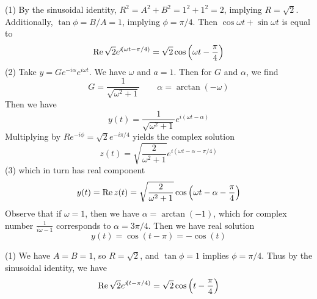 \documentclass[a4paper]{article}
\begin{document}

(1) By the sinusoidal identity, \(R^{2} = A^{2} + B^{2} = 1^{2} + 1^{2} = 2\), implying \(R = \sqrt{2}\). Additionally, \(\tan \phi = B/A = 1\), implying \(\phi = \pi / 4\). Then \(\cos \omega t + \sin \omega t\) is equal to
\[
	\operatorname{Re} \sqrt{2} e^{i \!\left( \omega t - \pi / 4 \right) } = \sqrt{2} \cos\left( \omega t - \frac{\pi }{4} \right)
\]
(2) Take \(y = Ge^{-i \alpha } e^{i \omega t}\). We have \(\omega \) and \(a = 1\). Then for \(G\) and \(\alpha \), we find
\[
	G = \frac{1}{\sqrt{\omega^{2} + 1}} \qquad \alpha = \arctan \!\left( -\omega  \right)  
\]
Then we have
\[
	y \!\left( t \right)  = \frac{1}{\sqrt{\omega^{2} + 1}} e^{i \!\left(\omega t - \alpha  \right)}
\]
Multiplying by \(Re^{-i \phi } = \sqrt{2} e^{- i\pi / 4 }\) yields the complex solution
\[
	z \!\left( t \right)  = \sqrt{\frac{2}{\omega^{2} + 1}}e^{i \!\left( \omega t - \alpha - \pi / 4 \right) } 
\]
(3) which in turn has real component
\[
	y \!\left( t \right) = \operatorname{Re} z \!\left( t \right) = \sqrt{\frac{2}{\omega^{2} + 1}} \cos\left( \omega t - \alpha - \frac{\pi }{4} \right)
\]
Observe that if \(\omega = 1\), then we have \(\alpha = \arctan \!\left( -1 \right) \), which for complex number \(\displaystyle{\frac{1}{i \omega - 1}}\) corresponds to \(\alpha = 3 \pi / 4\). Then we have real solution
\[
	y \!\left( t \right) = \cos\left( t - \pi  \right) = - \cos\left( t \right)
\]


(1) We have \(A = B = 1\), so \(R = \sqrt{2}\), and \(\tan \phi = 1\) implies \(\phi = \pi / 4\). Thus by the sinusoidal identity, we have
\[
	\operatorname{Re} \sqrt{2} e^{i \!\left( t - \pi / 4 \right) } = \sqrt{2} \cos\left( t - \frac{\pi }{4} \right)
\]
\end{document}
